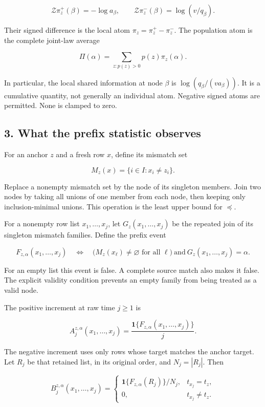 \[
\mathcal Z\pi_z^+(\beta)=-\log a_\beta,
\qquad
\mathcal Z\pi_z^-(\beta)=\log(v/q_\beta).
\]

Their signed difference is the local atom \(\pi_z=\pi_z^+-\pi_z^-\). The population atom is the complete joint-law average

\[
\Pi(\alpha)=\sum_{z:p(z)>0}p(z)\pi_z(\alpha).
\]

In particular, the local shared information at node \(\beta\) is \(\log(q_\beta/(v a_\beta))\). It is a cumulative quantity, not generally an individual atom. Negative signed atoms are permitted. None is clamped to zero.

\subsection{3. What the prefix statistic observes}\label{what-the-prefix-statistic-observes}

For an anchor \(z\) and a fresh row \(x\), define its mismatch set

\[
M_z(x)=\{i\in I:x_i\ne z_i\}.
\]

Replace a nonempty mismatch set by the node of its singleton members. Join two nodes by taking all unions of one member from each node, then keeping only inclusion-minimal unions. This operation is the least upper bound for \(\preceq\).

For a nonempty row list \(x_1,\ldots,x_j\), let \(G_z(x_1,\ldots,x_j)\) be the repeated join of its singleton mismatch families. Define the prefix event

\[
F_{z,\alpha}(x_1,\ldots,x_j)
\quad\Longleftrightarrow\quad
\bigl(M_z(x_\ell)\ne\varnothing\text{ for all }\ell\bigr)
\ \text{and}\ G_z(x_1,\ldots,x_j)=\alpha.
\]

For an empty list this event is false. A complete source match also makes it false. The explicit validity condition prevents an empty family from being treated as a valid node.

The positive increment at raw time \(j\ge1\) is

\[
A_j^{z,\alpha}(x_1,\ldots,x_j)
=\frac{\mathbf1\{F_{z,\alpha}(x_1,\ldots,x_j)\}}{j}.
\]

The negative increment uses only rows whose target matches the anchor target. Let \(R_j\) be that retained list, in its original order, and \(N_j=|R_j|\). Then

\[
B_j^{z,\alpha}(x_1,\ldots,x_j)=
\begin{cases}
\mathbf1\{F_{z,\alpha}(R_j)\}/N_j,&t_{x_j}=t_z,\\
0,&t_{x_j}\ne t_z.
\end{cases}
\]

